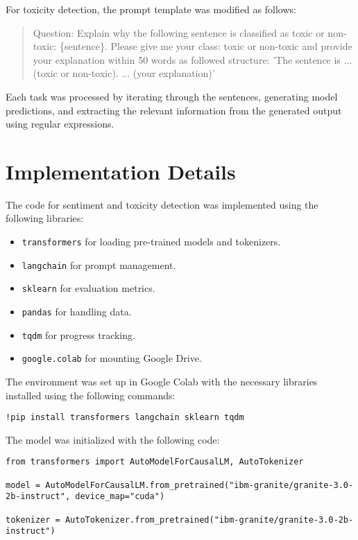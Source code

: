 \documentclass[11pt]{article}
\begin{document}
For toxicity detection, the prompt template was modified as follows:
\begin{quote}
  Question: Explain why the following sentence is classified as toxic or non-toxic: \{sentence\}. Please give me your class: toxic or non-toxic and provide your explanation within 50 words as followed structure: 'The sentence is ... (toxic or non-toxic). ... (your explanation)'
\end{quote}

Each task was processed by iterating through the sentences, generating model predictions, and extracting the relevant information from the generated output using regular expressions.

\section{Implementation Details}
The code for sentiment and toxicity detection was implemented using the following libraries:
\begin{itemize}
  \item \texttt{transformers} for loading pre-trained models and tokenizers.
  \item \texttt{langchain} for prompt management.
  \item \texttt{sklearn} for evaluation metrics.
  \item \texttt{pandas} for handling data.
  \item \texttt{tqdm} for progress tracking.
  \item \texttt{google.colab} for mounting Google Drive.
\end{itemize}

The environment was set up in Google Colab with the necessary libraries installed using the following commands:
\begin{lstlisting}
!pip install transformers langchain sklearn tqdm
\end{lstlisting}

The model was initialized with the following code:

\begin{lstlisting}
from transformers import AutoModelForCausalLM, AutoTokenizer

model = AutoModelForCausalLM.from_pretrained("ibm-granite/granite-3.0-2b-instruct", device_map="cuda")

tokenizer = AutoTokenizer.from_pretrained("ibm-granite/granite-3.0-2b-instruct")
\end{lstlisting}
\end{document}
